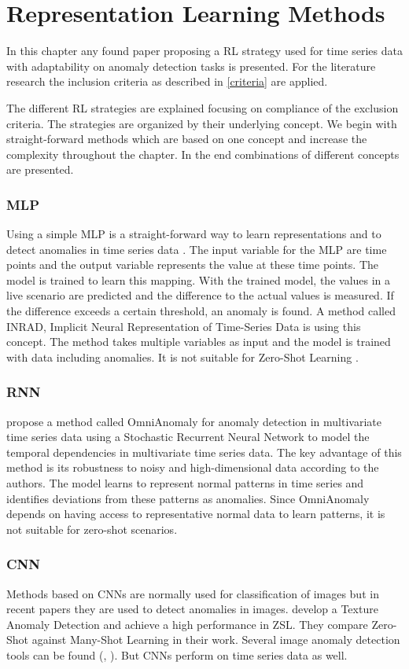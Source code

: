 \section{Representation Learning Methods}\label{review}
In this chapter any found paper proposing a RL strategy used for time series data with adaptability on anomaly detection tasks is presented. For the literature research the inclusion criteria as described in \ref{criteria} are applied.

The different RL strategies are explained focusing on compliance of the exclusion criteria. The strategies are organized by their underlying concept. We begin with straight-forward methods which are based on one concept and increase the complexity throughout the chapter. In the end combinations of different concepts are presented.
\subsubsection{MLP}
Using a simple MLP is a straight-forward way to learn representations and to detect anomalies in time series data \cite{nielsen_neural_2015}. The input variable for the MLP are time points and the output variable represents the value at these time points. The model is trained to learn this mapping. With the trained model, the values in a live scenario are predicted and the difference to the actual values is measured. If the difference exceeds a certain threshold, an anomaly is found. A method called INRAD, Implicit Neural Representation of Time-Series Data is using this concept. The method takes multiple variables as input and the model is trained with data including anomalies. It is not suitable for Zero-Shot Learning \cite{jeong_time-series_2022}.
\subsubsection{RNN}
\cite{su_robust_2019} propose a method called OmniAnomaly for anomaly detection in multivariate time series data using a Stochastic Recurrent Neural Network to model the temporal dependencies in multivariate time series data.
The key advantage of this method is its robustness to noisy and high-dimensional data according to the authors. The model learns to represent normal patterns in time series and identifies deviations from these patterns as anomalies. Since OmniAnomaly depends on having access to representative normal data to learn patterns, it is not suitable for zero-shot scenarios.
\subsubsection{CNN}
Methods based on CNNs are normally used for classification of images but in recent papers they are used to detect anomalies in images. \cite{aota_zero-shot_2023} develop a Texture Anomaly Detection and achieve a high performance in ZSL. They compare Zero-Shot against Many-Shot Learning in their work. Several image anomaly detection tools can be found (\cite{sabokrou_deep-anomaly__2018}, \cite{aota_zero-shot_2023}). But CNNs perform on time series data as well.


